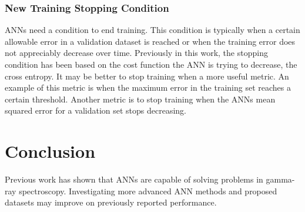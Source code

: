 \documentclass[thesis,tocnosub,noragright,centerchapter,12pt,fullpage]{uiucecethesis09}
\begin{document}
\subsection{New Training Stopping Condition}

ANNs need a condition to end training. This condition is typically when a certain allowable error in a validation dataset is reached or when the training error does not appreciably decrease over time. Previously in this work, the stopping condition has been based on the cost function the ANN is trying to decrease, the cross entropy. It may be better to stop training when a more useful metric. An example of this metric is when the maximum error in the training set reaches a certain threshold. Another metric is to stop training when the ANNs mean squared error for a validation set stops decreasing.



\chapter{Conclusion}

Previous work has shown that ANNs are capable of solving problems in gamma-ray spectroscopy. Investigating more advanced ANN methods and proposed datasets may improve on previously reported performance.








\end{document}
